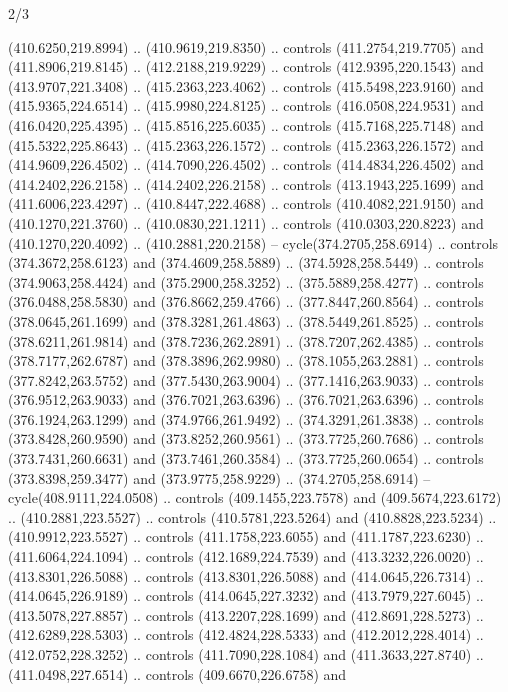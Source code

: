 \begin{flagdescription}{2/3}
\begin{scope}[xshift=0.5\flaglength,yshift=0.5\flagwidth,scale=\flagwidth/495.65]
\begin{scope}[y=0.8pt, x=0.8pt, yscale=-1,shift={(-463.76,-309.78)}]
  (410.6250,219.8994) .. (410.9619,219.8350) .. controls (411.2754,219.7705) and
  (411.8906,219.8145) .. (412.2188,219.9229) .. controls (412.9395,220.1543) and
  (413.9707,221.3408) .. (415.2363,223.4062) .. controls (415.5498,223.9160) and
  (415.9365,224.6514) .. (415.9980,224.8125) .. controls (416.0508,224.9531) and
  (416.0420,225.4395) .. (415.8516,225.6035) .. controls (415.7168,225.7148) and
  (415.5322,225.8643) .. (415.2363,226.1572) .. controls (415.2363,226.1572) and
  (414.9609,226.4502) .. (414.7090,226.4502) .. controls (414.4834,226.4502) and
  (414.2402,226.2158) .. (414.2402,226.2158) .. controls (413.1943,225.1699) and
  (411.6006,223.4297) .. (410.8447,222.4688) .. controls (410.4082,221.9150) and
  (410.1270,221.3760) .. (410.0830,221.1211) .. controls (410.0303,220.8223) and
  (410.1270,220.4092) .. (410.2881,220.2158) -- cycle(374.2705,258.6914) ..
  controls (374.3672,258.6123) and (374.4609,258.5889) .. (374.5928,258.5449) ..
  controls (374.9063,258.4424) and (375.2900,258.3252) .. (375.5889,258.4277) ..
  controls (376.0488,258.5830) and (376.8662,259.4766) .. (377.8447,260.8564) ..
  controls (378.0645,261.1699) and (378.3281,261.4863) .. (378.5449,261.8525) ..
  controls (378.6211,261.9814) and (378.7236,262.2891) .. (378.7207,262.4385) ..
  controls (378.7177,262.6787) and (378.3896,262.9980) .. (378.1055,263.2881) ..
  controls (377.8242,263.5752) and (377.5430,263.9004) .. (377.1416,263.9033) ..
  controls (376.9512,263.9033) and (376.7021,263.6396) .. (376.7021,263.6396) ..
  controls (376.1924,263.1299) and (374.9766,261.9492) .. (374.3291,261.3838) ..
  controls (373.8428,260.9590) and (373.8252,260.9561) .. (373.7725,260.7686) ..
  controls (373.7431,260.6631) and (373.7461,260.3584) .. (373.7725,260.0654) ..
  controls (373.8398,259.3477) and (373.9775,258.9229) .. (374.2705,258.6914) --
  cycle(408.9111,224.0508) .. controls (409.1455,223.7578) and
  (409.5674,223.6172) .. (410.2881,223.5527) .. controls (410.5781,223.5264) and
  (410.8828,223.5234) .. (410.9912,223.5527) .. controls (411.1758,223.6055) and
  (411.1787,223.6230) .. (411.6064,224.1094) .. controls (412.1689,224.7539) and
  (413.3232,226.0020) .. (413.8301,226.5088) .. controls (413.8301,226.5088) and
  (414.0645,226.7314) .. (414.0645,226.9189) .. controls (414.0645,227.3232) and
  (413.7979,227.6045) .. (413.5078,227.8857) .. controls (413.2207,228.1699) and
  (412.8691,228.5273) .. (412.6289,228.5303) .. controls (412.4824,228.5333) and
  (412.2012,228.4014) .. (412.0752,228.3252) .. controls (411.7090,228.1084) and
  (411.3633,227.8740) .. (411.0498,227.6514) .. controls (409.6670,226.6758) and

\end{scope}
\end{scope}
\end{flagdescription}

